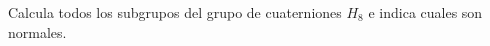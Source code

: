 \question 
Calcula todos los subgrupos del grupo de cuaterniones $H_8$ e 
indica cuales son normales.